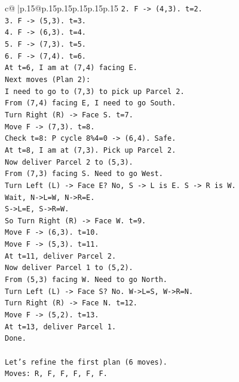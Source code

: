 \documentclass{article}
\begin{document}
{\begin{supertabular}{c@{$\;$}|p{.15\linewidth}@{}p{.15\linewidth}p{.15\linewidth}p{.15\linewidth}p{.15\linewidth}p{.15\linewidth}}
{{{\texttt{2. F {-}> (4,3). t=2.} \\
\texttt{3. F {-}> (5,3). t=3.} \\
\texttt{4. F {-}> (6,3). t=4.} \\
\texttt{5. F {-}> (7,3). t=5.} \\
\texttt{6. F {-}> (7,4). t=6.} \\
\texttt{At t=6, I am at (7,4) facing E.} \\
\texttt{Next moves (Plan 2):} \\
\texttt{I need to go to (7,3) to pick up Parcel 2.} \\
\texttt{From (7,4) facing E, I need to go South.} \\
\texttt{Turn Right (R) {-}> Face S. t=7.} \\
\texttt{Move F {-}> (7,3). t=8.} \\
\texttt{Check t=8: P cycle 8\%4=0 {-}> (6,4). Safe.} \\
\texttt{At t=8, I am at (7,3). Pick up Parcel 2.} \\
\texttt{Now deliver Parcel 2 to (5,3).} \\
\texttt{From (7,3) facing S. Need to go West.} \\
\texttt{Turn Left (L) {-}> Face E? No, S {-}> L is E. S {-}> R is W.} \\
\texttt{Wait, N{-}>L=W, N{-}>R=E.} \\
\texttt{S{-}>L=E, S{-}>R=W.} \\
\texttt{So Turn Right (R) {-}> Face W. t=9.} \\
\texttt{Move F {-}> (6,3). t=10.} \\
\texttt{Move F {-}> (5,3). t=11.} \\
\texttt{At t=11, deliver Parcel 2.} \\
\texttt{Now deliver Parcel 1 to (5,2).} \\
\texttt{From (5,3) facing W. Need to go North.} \\
\texttt{Turn Left (L) {-}> Face S? No. W{-}>L=S, W{-}>R=N.} \\
\texttt{Turn Right (R) {-}> Face N. t=12.} \\
\texttt{Move F {-}> (5,2). t=13.} \\
\texttt{At t=13, deliver Parcel 1.} \\
\texttt{Done.} \\
\\ 
\texttt{Let's refine the first plan (6 moves).} \\
\texttt{Moves: R, F, F, F, F, F.} \\
}}}
\end{supertabular}}
\end{document}
